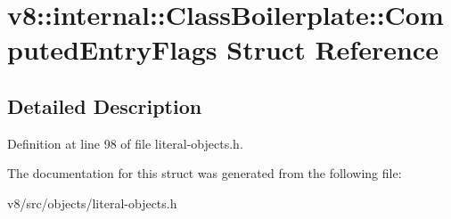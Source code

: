 \hypertarget{structv8_1_1internal_1_1ClassBoilerplate_1_1ComputedEntryFlags}{}\section{v8\+:\+:internal\+:\+:Class\+Boilerplate\+:\+:Computed\+Entry\+Flags Struct Reference}
\label{structv8_1_1internal_1_1ClassBoilerplate_1_1ComputedEntryFlags}


\subsection{Detailed Description}


Definition at line 98 of file literal-\/objects.\+h.



The documentation for this struct was generated from the following file\+:\begin{DoxyCompactItemize}
\item 
v8/src/objects/literal-\/objects.\+h\end{DoxyCompactItemize}
